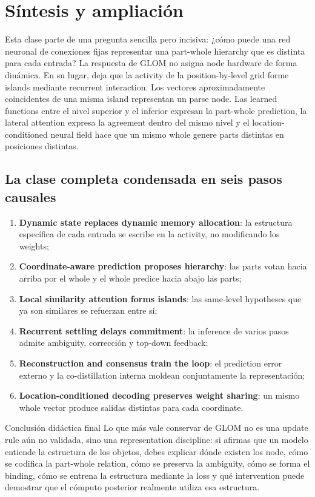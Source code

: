 \section{Síntesis y ampliación}

Esta clase parte de una pregunta sencilla pero incisiva: ¿cómo puede una red neuronal de conexiones fijas representar una part-whole hierarchy que es distinta para cada entrada? La respuesta de GLOM no asigna node hardware de forma dinámica. En su lugar, deja que la activity de la position-by-level grid forme islands mediante recurrent interaction. Los vectores aproximadamente coincidentes de una misma island representan un parse node. Las learned functions entre el nivel superior y el inferior expresan la part-whole prediction, la lateral attention expresa la agreement dentro del mismo nivel y el location-conditioned neural field hace que un mismo whole genere parts distintas en posiciones distintas.

\subsection{La clase completa condensada en seis pasos causales}

\begin{enumerate}
  \item \textbf{Dynamic state replaces dynamic memory allocation}: la estructura específica de cada entrada se escribe en la activity, no modificando los weights;
  \item \textbf{Coordinate-aware prediction proposes hierarchy}: las parts votan hacia arriba por el whole y el whole predice hacia abajo las parts;
  \item \textbf{Local similarity attention forms islands}: las same-level hypotheses que ya son similares se refuerzan entre sí;
  \item \textbf{Recurrent settling delays commitment}: la inference de varios pasos admite ambiguity, corrección y top-down feedback;
  \item \textbf{Reconstruction and consensus train the loop}: el prediction error externo y la co-distillation interna moldean conjuntamente la representación;
  \item \textbf{Location-conditioned decoding preserves weight sharing}: un mismo whole vector produce salidas distintas para cada coordinate.
\end{enumerate}

\begin{importantbox}{Conclusión didáctica final}
Lo que más vale conservar de GLOM no es una update rule aún no validada, sino una representation discipline: si afirmas que un modelo entiende la estructura de los objetos, debes explicar dónde existen los node, cómo se codifica la part-whole relation, cómo se preserva la ambiguity, cómo se forma el binding, cómo se entrena la estructura mediante la loss y qué intervention puede demostrar que el cómputo posterior realmente utiliza esa estructura.
\end{importantbox}

